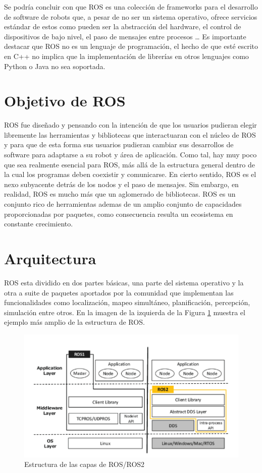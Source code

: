 Se podría concluir con que ROS es una colección de frameworks para el desarrollo de software de robots que, a pesar de no ser un sistema operativo, ofrece servicios estándar de estos como pueden ser la abstracción del hardware, el control de dispositivos de bajo nivel, el paso de mensajes entre procesos … Es importante destacar que ROS no es un lenguaje de programación, el hecho de que esté escrito en C++ no implica que la implementación de librerías en otros lenguajes como Python o Java no sea soportada.

\section{Objetivo de ROS}

ROS fue diseñado y pensando con la intención de que los usuarios pudieran elegir libremente las herramientas y bibliotecas que interactuaran con el núcleo de ROS y para que de esta forma sus usuarios pudieran cambiar sus desarrollos de software para adaptarse a su robot y área de aplicación. Como tal, hay muy poco que sea realmente esencial para ROS, más allá de la estructura general dentro de la cual los programas deben coexistir y comunicarse. En cierto sentido, ROS es el nexo subyacente detrás de los nodos y el paso de mensajes. Sin embargo, en realidad, ROS es mucho más que un aglomerado de bibliotecas. ROS es un conjunto rico de herramientas ademas de un amplio conjunto de capacidades proporcionadas por paquetes, como consecuencia resulta un ecosistema en constante crecimiento. 

\section{Arquitectura}

ROS esta dividido en dos partes básicas, una parte del sistema operativo y la otra a suite de paquetes aportados por la comunidad que implementan las funcionalidades como localización, mapeo simultáneo, planificación, percepción, simulación entre otros. En la imagen de la izquierda de la Figura \ref{fig:Estructura} muestra el ejemplo más amplio de la estructura de ROS.

\begin{figure}[H]
	\centering
	\includegraphics[scale=0.75]{imagenes/Estructura.png}
	\caption{\label{fig:Estructura}Estructura de las capas de ROS/ROS2}
\end{figure}


